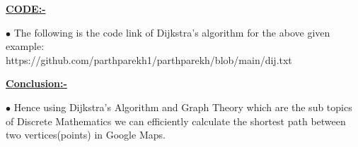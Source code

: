 \documentclass[23pt]{article}
\begin{document}
 \hypertarget{target:CODE}{}
 
 \begin{center}
  \centering  \item \textbf{\huge\underline{CODE:-}} \\
 \end{center}
 $\bullet$ The following is the code link of Dijkstra's algorithm for the above given example:\\
 \small https://github.com/parthparekh1/parthparekh/blob/main/dij.txt
 \\
 \begin{center}
 \centering  \item \textbf{\huge\underline{Conclusion:-}} \\
\end{center}
$\bullet$ Hence using Dijkstra’s Algorithm and Graph Theory which are the sub topics of Discrete Mathematics we can efficiently calculate the shortest path between two vertices(points) in Google Maps.
\newpage
 \\
 \hypertarget{target:REFERENCES}{}
 
 
 
\end{document}
